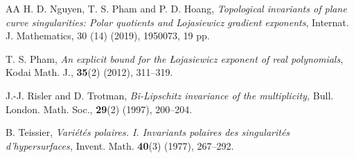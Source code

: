 \documentclass[reqno, 12pt ,a4letter]{amsart}
\theoremstyle{definition}
\begin{document}
\begin{thebibliography}{AA}
H. D. Nguyen,  T. S. Pham and P. D. Hoang, {\em Topological invariants of plane curve singularities: Polar quotients and Lojasiewicz gradient exponents}, Internat. J. Mathematics, 30 (14) (2019), 1950073, 19 pp.

T. S. Pham, {\em An explicit bound for the {{\L}}ojasiewicz exponent of real polynomials}, Kodai Math. J., {\bf 35}(2) (2012), 311--319.

J.-J. Risler and D. Trotman, {\em Bi-Lipschitz invariance of the multiplicity,} Bull. London. Math. Soc., {\bf 29}(2) (1997), 200--204.

B. Teissier, {\em Vari\'et\'es polaires. I. Invariants polaires des singularit\'es d'hypersurfaces,} Invent. Math. {\bf 40}(3) (1977), 267--292.
\end{thebibliography}
\end{document}
